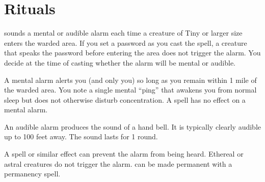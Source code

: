 \section{Rituals}

\spellrng{\rngclose}
\begin{spelleffect}
 sounds a mental or audible alarm each time a creature of Tiny or larger size enters the warded area. If you set a password as you cast the spell, a creature that speaks the password before entering the area does not trigger the alarm. You decide at the time of casting whether the alarm will be mental or audible.
\par {} A mental alarm alerts you (and only you) so long as you remain within 1 mile of the warded area. You note a single mental ``ping'' that awakens you from normal sleep but does not otherwise disturb concentration. A  spell has no effect on a mental alarm.
\par {} An audible alarm produces the sound of a hand bell. It is typically clearly audible up to 100 feet away. The sound lasts for 1 round. 
\end{spelleffect}
\begin{spellnotes}
A  spell or similar effect can prevent the alarm from being heard. Ethereal or astral creatures do not trigger the alarm.  can be made permanent with a permanency spell.
\end{spellnotes}

